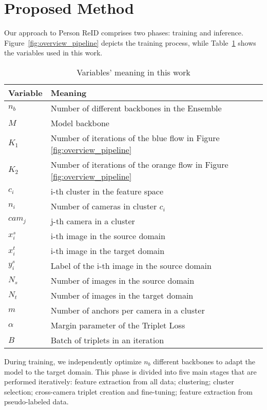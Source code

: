 \documentclass[journal]{IEEEtran}
\begin{document}
\section{Proposed Method}
\label{sec:proposed_method}

Our approach to Person ReID comprises two phases: training and inference.  Figure~\ref{fig:overview_pipeline} depicts the 
training process, while 
Table~\ref{tab:terminology} shows the variables used in this work.

\begin{table}[ht]
\caption{Variables' meaning in this work} \label{tab:terminology}
\centering
\begin{tabular}{|p{1.0cm}|p{6.0cm}|}
\hline
\hline
Variable & Meaning  \\ \hline
$n_{b}$ & Number of different backbones in the Ensemble \\
$M$ & Model backbone \\ 
$K_{1}$ & Number of iterations of the blue flow in Figure \ref{fig:overview_pipeline} \\
$K_{2}$ & Number of iterations of the orange flow in Figure \ref{fig:overview_pipeline} \\
$c_{i}$ & i-th cluster in the feature space \\
$n_{i}$ & Number of cameras in cluster $c_{i}$ \\
$cam_{j}$ & j-th camera in a cluster \\
$x_{i}^{s}$ & i-th image in the source domain \\
$x_{i}^{t}$ & i-th image in the target domain \\
$y_{i}^{s}$ & Label of the i-th image in the source domain \\
$N_{s}$ & Number of images in the source domain \\
$N_{t}$ & Number of images in the target domain \\
$m$ & Number of anchors per camera in a cluster \\
$\alpha $ & Margin parameter of the Triplet Loss \\
$B$ & Batch of triplets in an iteration \\

\hline
\end{tabular}
\end{table}

During training, we independently optimize $n_{b}$ different backbones to adapt the model to the target domain. This phase is divided into five main stages that are performed iteratively: feature extraction from all data; clustering; cluster selection; cross-camera triplet creation and fine-tuning; feature extraction from pseudo-labeled data.
\end{document}
